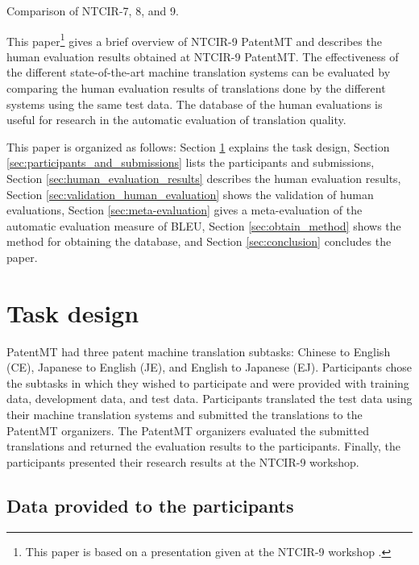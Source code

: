 \documentclass[english]{jnlp_1.4}
\begin{document}
\begin{table}[t]
\caption{Comparison of NTCIR-7, 8, and 9.}
\label{table:comparison_between_ntcir}

\end{table}

This paper\footnote{This paper is based on a presentation given at the NTCIR-9 workshop \cite{Goto-EtAl:NTCIR9}.}
 gives a brief overview of NTCIR-9 PatentMT and describes the human evaluation results obtained at NTCIR-9 PatentMT.
The effectiveness of the different state-of-the-art machine translation systems can be evaluated by comparing the human evaluation results of translations done by the different systems using the same test data. 
The database of the human evaluations is useful for research in the automatic evaluation of translation quality. 

This paper is organized as follows: 
Section \ref{sec:task_design} explains the task design, 
Section \ref{sec:participants_and_submissions} lists the participants and submissions, 
Section \ref{sec:human_evaluation_results} describes the human evaluation results, 
Section \ref{sec:validation_human_evaluation} shows the validation of human evaluations, 
Section \ref{sec:meta-evaluation} gives a meta-evaluation of the automatic evaluation measure of BLEU, 
Section \ref{sec:obtain_method} shows the method for obtaining the database, 
and Section \ref{sec:conclusion} concludes the paper.


\section{Task design}
\label{sec:task_design}

PatentMT had three patent machine translation subtasks: Chinese to English (CE), Japanese to English (JE), and English to Japanese (EJ). 
Participants chose the subtasks in which they wished to participate and were provided with training data, development data, and test data. 
Participants translated the test data using their machine translation systems and submitted the translations to the PatentMT organizers. 
The PatentMT organizers evaluated the submitted translations and returned the evaluation results to the participants. 
Finally, the participants presented their research results at the NTCIR-9 workshop. 

\subsection{Data provided to the participants}
\end{document}
